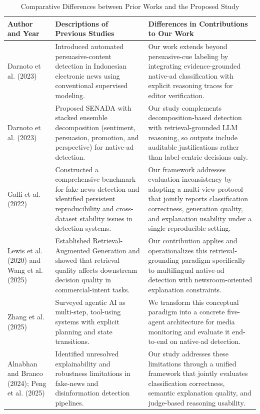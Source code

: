 \documentclass{ieeeaccess}
\begin{document}
\begin{table}[!t]
\caption{Comparative Differences between Prior Works and the Proposed Study}
\label{tab:related_work_comparison}
\begin{center}
\begin{tabular}{|p{}|p{}|p{}|}
\hline
\textbf{Author and Year} & \textbf{Descriptions of Previous Studies} & \textbf{Differences in Contributions to Our Work} \\
\hline
Darnoto et al. (2023) \cite{r8} & Introduced automated persuasive-content detection in Indonesian electronic news using conventional supervised modeling. & Our work extends beyond persuasive-cue labeling by integrating evidence-grounded native-ad classification with explicit reasoning traces for editor verification. \\
\hline
Darnoto et al. (2023) \cite{r6} & Proposed SENADA with stacked ensemble decomposition (sentiment, persuasion, promotion, and perspective) for native-ad detection. & Our study complements decomposition-based detection with retrieval-grounded LLM reasoning, so outputs include auditable justifications rather than label-centric decisions only. \\
\hline
Galli et al. (2022) \cite{r14} & Constructed a comprehensive benchmark for fake-news detection and identified persistent reproducibility and cross-dataset stability issues in detection systems. & Our framework addresses evaluation inconsistency by adopting a multi-view protocol that jointly reports classification correctness, generation quality, and explanation usability under a single reproducible setting. \\
\hline
Lewis et al. (2020) and Wang et al. (2025) \cite{r21,r20} & Established Retrieval-Augmented Generation and showed that retrieval quality affects downstream decision quality in commercial-intent tasks. & Our contribution applies and operationalizes this retrieval-grounding paradigm specifically to multilingual native-ad detection with newsroom-oriented explanation constraints. \\
\hline
Zhang et al. (2025) \cite{r13} & Surveyed agentic AI as multi-step, tool-using systems with explicit planning and state transitions. & We transform this conceptual paradigm into a concrete five-agent architecture for media monitoring and evaluate it end-to-end on native-ad detection. \\
\hline
Alnabhan and Branco (2024); Peng et al. (2025) \cite{r9,r10} & Identified unresolved explainability and robustness limitations in fake-news and disinformation detection pipelines. & Our study addresses these limitations through a unified framework that jointly evaluates classification correctness, semantic explanation quality, and judge-based reasoning usability. \\
\hline
\end{tabular}
\end{center}
\end{table}
\end{document}
